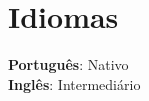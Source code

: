 \documentclass[letterpaper,11pt]{article}
\begin{document}
\section{Idiomas}
 \begin{itemize}[leftmargin=0.15in, label={}]
    \small{\item{
     \textbf{Português}{: Nativo} \\
     \textbf{Inglês}{: Intermediário}
    }}
 \end{itemize}
\end{document}
